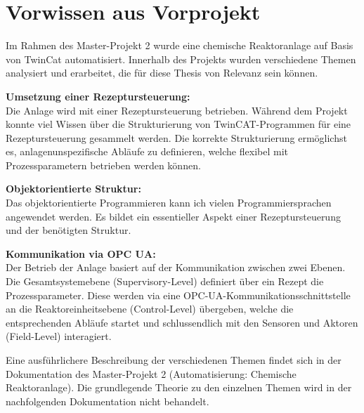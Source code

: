 \section{Vorwissen aus Vorprojekt} \label{Vorwissen aus Vorprojekt}
	Im Rahmen des Master-Projekt 2 wurde eine chemische Reaktoranlage auf Basis von TwinCat automatisiert. Innerhalb des Projekts wurden verschiedene Themen analysiert und erarbeitet, die für diese Thesis von Relevanz sein können.
	\vspace{3mm}
	
	\textbf{Umsetzung einer Rezeptursteuerung:} \vspace{2mm} 
	\\
	Die Anlage wird mit einer Rezeptursteuerung betrieben. Während dem Projekt konnte viel Wissen über die Strukturierung von TwinCAT-Programmen für eine Rezeptursteuerung gesammelt werden. Die korrekte Strukturierung ermöglichst es, anlagenunspezifische Abläufe zu definieren, welche flexibel mit Prozessparametern betrieben werden können. 
	\vspace{3mm}
	
	\textbf{Objektorientierte Struktur:} \vspace{2mm} 
	\\
	Das objektorientierte Programmieren kann ich vielen Programmiersprachen angewendet werden. Es bildet ein essentieller Aspekt einer Rezeptursteuerung und der benötigten Struktur.
	\vspace{3mm}
	
	\textbf{Kommunikation via OPC UA:} \vspace{2mm} 
	\\
	Der Betrieb der Anlage basiert auf der Kommunikation zwischen zwei Ebenen. Die Gesamtsystemebene (Supervisory-Level) definiert über ein Rezept die Prozessparameter. Diese werden via eine OPC-UA-Kommunikationsschnittstelle an die Reaktoreinheitsebene (Control-Level) übergeben, welche die entsprechenden Abläufe startet und schlussendlich mit den Sensoren und Aktoren (Field-Level) interagiert. 
	\vspace{3mm}
	
	Eine ausführlichere Beschreibung der verschiedenen Themen findet sich in der Dokumentation des Master-Projekt 2 (Automatisierung: Chemische Reaktoranlage). Die grundlegende Theorie zu den einzelnen Themen wird in der nachfolgenden Dokumentation  nicht behandelt.
	
